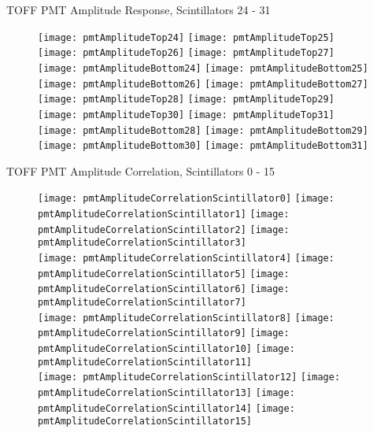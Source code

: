 \documentclass[11pt]{beamer}
\begin{document}
\begin{frame}{TOFF PMT Amplitude Response, Scintillators 24 - 31}
\begin{figure}
\centering
\texttt{[image: pmtAmplitudeTop24]}
\texttt{[image: pmtAmplitudeTop25]}
\texttt{[image: pmtAmplitudeTop26]}
\texttt{[image: pmtAmplitudeTop27]} \\ 
\texttt{[image: pmtAmplitudeBottom24]}
\texttt{[image: pmtAmplitudeBottom25]}
\texttt{[image: pmtAmplitudeBottom26]}
\texttt{[image: pmtAmplitudeBottom27]} \\
\texttt{[image: pmtAmplitudeTop28]}
\texttt{[image: pmtAmplitudeTop29]}
\texttt{[image: pmtAmplitudeTop30]}
\texttt{[image: pmtAmplitudeTop31]} \\
\texttt{[image: pmtAmplitudeBottom28]}
\texttt{[image: pmtAmplitudeBottom29]}
\texttt{[image: pmtAmplitudeBottom30]}
\texttt{[image: pmtAmplitudeBottom31]} \\
\end{figure}
\end{frame}

\begin{frame}{TOFF PMT Amplitude Correlation, Scintillators 0 - 15}
\begin{figure}
\centering
\texttt{[image: pmtAmplitudeCorrelationScintillator0]}
\texttt{[image: pmtAmplitudeCorrelationScintillator1]}
\texttt{[image: pmtAmplitudeCorrelationScintillator2]}
\texttt{[image: pmtAmplitudeCorrelationScintillator3]} \\
\texttt{[image: pmtAmplitudeCorrelationScintillator4]}
\texttt{[image: pmtAmplitudeCorrelationScintillator5]}
\texttt{[image: pmtAmplitudeCorrelationScintillator6]}
\texttt{[image: pmtAmplitudeCorrelationScintillator7]} \\
\texttt{[image: pmtAmplitudeCorrelationScintillator8]}
\texttt{[image: pmtAmplitudeCorrelationScintillator9]}
\texttt{[image: pmtAmplitudeCorrelationScintillator10]}
\texttt{[image: pmtAmplitudeCorrelationScintillator11]} \\
\texttt{[image: pmtAmplitudeCorrelationScintillator12]}
\texttt{[image: pmtAmplitudeCorrelationScintillator13]}
\texttt{[image: pmtAmplitudeCorrelationScintillator14]}
\texttt{[image: pmtAmplitudeCorrelationScintillator15]} \\
\end{figure}
\end{frame}
\end{document}
